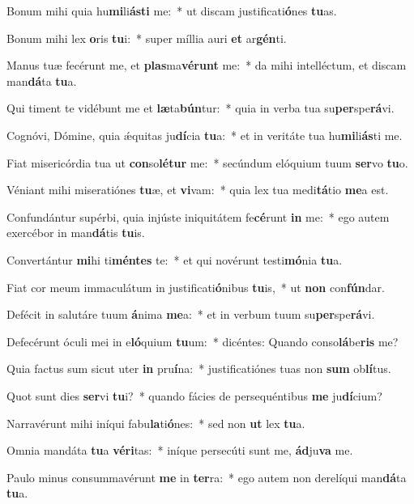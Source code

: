 \item Bonum mihi quia hu\textbf{mi}li\textbf{ás}\textbf{ti} me:~* ut discam justificati\textbf{ó}nes \textbf{tu}as.
\item Bonum mihi lex \textbf{o}ris \textbf{tu}i:~* super míllia auri \textbf{et} ar\textbf{gén}ti.
\item Manus tuæ fecérunt me, et \textbf{plas}ma\textbf{vé}\textbf{runt} me:~* da mihi intelléctum, et discam man\textbf{dá}ta \textbf{tu}a.
\item Qui timent te vidébunt me et \textbf{læ}ta\textbf{bún}tur:~* quia in verba tua su\textbf{per}spe\textbf{rá}vi.
\item Cognóvi, Dómine, quia ǽquitas ju\textbf{dí}cia \textbf{tu}a:~* et in veritáte tua hu\textbf{mi}li\textbf{ás}ti me.
\item Fiat misericórdia tua ut \textbf{con}so\textbf{lé}\textbf{tur} me:~* secúndum elóquium tuum \textbf{ser}vo \textbf{tu}o.
\item Véniant mihi miseratiónes \textbf{tu}æ, et \textbf{vi}vam:~* quia lex tua medi\textbf{tá}tio \textbf{me}a est.
\item Confundántur supérbi, quia injúste iniquitátem fe\textbf{cé}runt \textbf{in} me:~* ego autem exercébor in man\textbf{dá}tis \textbf{tu}is.
\item Convertántur \textbf{mi}hi ti\textbf{mén}\textbf{tes} te:~* et qui novérunt testi\textbf{mó}nia \textbf{tu}a.
\item Fiat cor meum immaculátum in justificati\textbf{ó}nibus \textbf{tu}is,~* ut \textbf{non} con\textbf{fún}dar.
\item Defécit in salutáre tuum \textbf{á}nima \textbf{me}a:~* et in verbum tuum su\textbf{per}spe\textbf{rá}vi.
\item Defecérunt óculi mei in e\textbf{ló}quium \textbf{tu}um:~* dicéntes: Quando conso\textbf{lá}be\textbf{ris} me?
\item Quia factus sum sicut uter \textbf{in} pru\textbf{í}na:~* justificatiónes tuas non \textbf{sum} ob\textbf{lí}tus.
\item Quot sunt dies \textbf{ser}vi \textbf{tu}i?~* quando fácies de persequéntibus \textbf{me} ju\textbf{dí}cium?
\item Narravérunt mihi iníqui fabu\textbf{la}ti\textbf{ó}nes:~* sed non \textbf{ut} lex \textbf{tu}a.
\item Omnia mandáta \textbf{tu}a \textbf{vé}\textbf{ri}tas:~* iníque persecúti sunt me, \textbf{ád}ju\textbf{va} me.
\item Paulo minus consummavérunt \textbf{me} in \textbf{ter}ra:~* ego autem non derelíqui man\textbf{dá}ta \textbf{tu}a.
